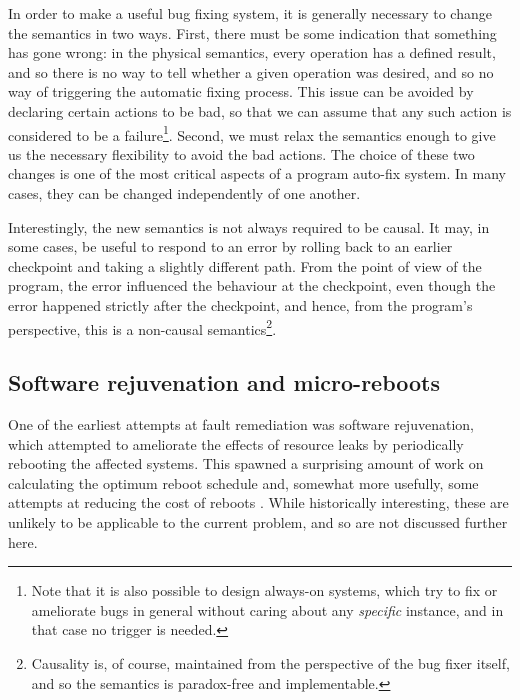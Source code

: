 In order to make a useful bug fixing system, it is generally necessary
to change the semantics in two ways.  First, there must be some
indication that something has gone wrong: in the physical semantics,
every operation has a defined result, and so there is no way to tell
whether a given operation was desired, and so no way of triggering the
automatic fixing process.  This issue can be avoided by declaring
certain actions to be bad, so that we can assume that any such action
is considered to be a failure\footnote{Note that it is also possible
  to design always-on systems, which try to fix or ameliorate bugs in
  general without caring about any \emph{specific} instance, and in
  that case no trigger is needed.  }.  Second, we must relax the semantics enough
to give us the necessary flexibility to avoid the bad actions.  The
choice of these two changes is one of the most critical aspects of a
program auto-fix system.  In many cases, they can be changed
independently of one another.

Interestingly, the new semantics is not always required to be causal.
It may, in some cases, be useful to respond to an error by rolling
back to an earlier checkpoint and taking a slightly different path.
From the point of view of the program, the error influenced the
behaviour at the checkpoint, even though the error happened strictly
after the checkpoint, and hence, from the program's perspective, this
is a non-causal semantics\footnote{Causality is, of course, maintained
  from the perspective of the bug fixer itself, and so the semantics
  is paradox-free and implementable.}.

\subsection{Software rejuvenation and micro-reboots}

One of the earliest attempts at fault remediation was software
rejuvenation\cite{Huang1995}, which attempted to ameliorate the
effects of resource leaks by periodically rebooting the affected
systems.  This spawned a surprising amount of work on calculating the
optimum reboot schedule
\cite{Li2002,Vaidyanathan1999,Vaidyanathan2001,Trivedi2000,Garg1998,Garg1995,Garg1998a,Castelli2001}
and, somewhat more usefully, some attempts at reducing the cost of
reboots \cite{Candea2002,Candea2001,Candea,Patterson2002}.  While
historically interesting, these are unlikely to be applicable to the
current problem, and so are not discussed further here.


